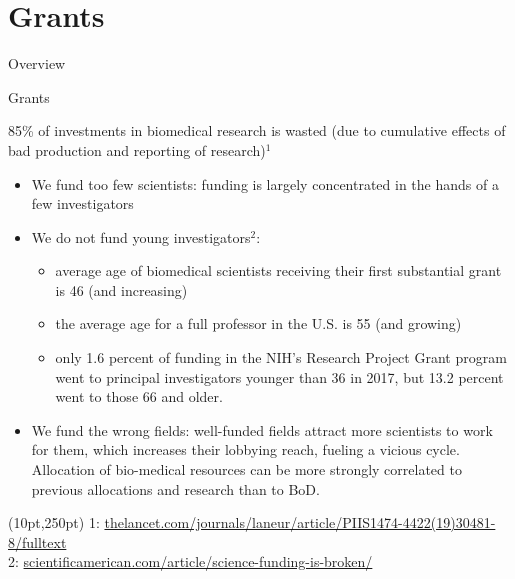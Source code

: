\documentclass{beamer}
\begin{document}
\section{Grants}
\begin{frame}{Overview}
\end{frame}
\begin{frame}{Grants}

	85\% of investments in biomedical research is wasted (due to cumulative effects of bad production and reporting of research)$^{1}$

	\begin{itemize}
		\item<2-> We fund too few scientists: funding is largely concentrated in the hands of a few investigators
		\item<3-> We do not fund young investigators$^{2}$: 
		\begin{itemize}
			\item<4-> average age of biomedical scientists receiving their first substantial grant is 46 (and increasing) 
			\item<5-> the average age for a full professor in the U.S. is 55 (and growing)
			\item<6-> only 1.6 percent of funding in the NIH's Research Project Grant program went to principal investigators younger than 36 in 2017, but 13.2 percent went to those 66 and older.
		\end{itemize}
		\item<7-> We fund the wrong fields: well-funded fields attract more scientists to work for them, which increases their lobbying reach, fueling a vicious cycle. Allocation of bio-medical resources can be more strongly correlated to previous allocations and research than to BoD.
	\end{itemize}
	

	\begin{textblock*}{300pt}(10pt,250pt)
		\tiny{1: \url{thelancet.com/journals/laneur/article/PIIS1474-4422(19)30481-8/fulltext}\\ 2: \url{scientificamerican.com/article/science-funding-is-broken/}}

	\end{textblock*}
	
\end{frame}
\end{document}
